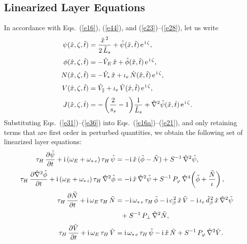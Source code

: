 \documentclass[12pt,prb,aps,notitlepage]{revtex4-1}
\begin{document}
\subsection{Linearized Layer Equations}
In accordance with Eqs.~(\ref{e16}), (\ref{e44}), and (\ref{e23})--(\ref{e28}), let us write
\begin{align}\label{e31}
\psi(\hat{x},\zeta,\hat{t}) &= \frac{\hat{x}^{\,2} }{2\,\hat{L}_s}+ \tilde{\psi}(\hat{x},\hat{t})\,{\rm e}^{\,{\rm i}\,\zeta},\\[0.5ex]
\phi(\hat{x},\zeta,\hat{t}) &=-\hat{V}_E\,\hat{x}+ \tilde{\phi}(\hat{x},\hat{t})\,{\rm e}^{\,{\rm i}\,\zeta},\\[0.5ex]
N(\hat{x},\zeta,\hat{t}) &= -\hat{V}_\ast\,\hat{x}+\iota_e\,\tilde{N}(\hat{x},\hat{t})\,{\rm e}^{\,{\rm i}\,\zeta},\\[0.5ex]
V(\hat{x},\zeta,\hat{t}) &= \hat{V}_\parallel +\iota_e\,\tilde{V}(\hat{x},\hat{t})\,{\rm e}^{\,{\rm i}\,\zeta},\\[0.5ex]
J(\hat{x},\zeta,\hat{t}) &=-\left(\frac{2}{s_s}-1\right)\!\frac{1}{\hat{L}_s}+ \hat{\nabla}^2\tilde{\psi}(\hat{x},\hat{t})\,{\rm e}^{\,{\rm i}\,\zeta}.\label{e36}
\end{align}
Substituting Eqs.~(\ref{e31})--(\ref{e36}) into Eqs.~(\ref{e16a})--(\ref{e21}), 
 and only retaining terms that
are first order in perturbed quantities, we obtain the following set of linearized layer equations:
\begin{align}\label{e37}
\tau_H\,\frac{\partial\tilde{\psi}}{\partial t}+{\rm i}\,(\omega_E +\omega_{\ast\,e})\,\tau_H\,\tilde{\psi} &= -{\rm i} \,\hat{x}\,(\tilde{\phi}-\tilde{N})+ S^{-1}\,\hat{\nabla}^2\tilde{\psi},\\[0.5ex]
\tau_H\,\frac{\partial\hat{\nabla}^2\tilde{\phi}}{\partial t}+{\rm i}\,(\omega_E+\omega_{\ast\,i})\,\tau_H\,\hat{\nabla}^2\tilde{\phi} &= -{\rm i}\,\hat{x}\,\hat{\nabla}^2\tilde{\psi}+S^{-1}\,P_\varphi\,\hat{\nabla}^4\!\left(\tilde{\phi} + \frac{\tilde{N}}{\iota}\right),\\[0.5ex]
\tau_H\,\frac{\partial\tilde{N}}{\partial t}+{\rm i}\,\omega_E\,\tau_H\,\tilde{N} &= -{\rm i}\,\omega_{\ast\,e}\,\tau_H\,\tilde{\phi}-{\rm i}\,c_\beta^{\,2}\,\hat{x}\,\tilde{V} - {\rm i}\,\iota_e\,\hat{d}_\beta^{\,2}\,\hat{x}\,\hat{\nabla}^2\tilde{\psi}\nonumber\\[0.5ex]
&\phantom{=} + S^{-1}\,P_\perp\,\hat{\nabla}^2 \tilde{N},\label{e60}\\[0.5ex]
\tau_H\,\frac{\partial\tilde{V}}{\partial t}+{\rm i}\,\omega_E\,\tau_H\,\tilde{V} &= {\rm i}\,\omega_{\ast\,e}\,\tau_H\,\tilde{\psi} - {\rm i}\,\hat{x}\,\tilde{N}
+ S^{-1}\,P_\varphi\,\hat{\nabla}^2\tilde{V}.\label{e40}
\end{align}
\end{document}
